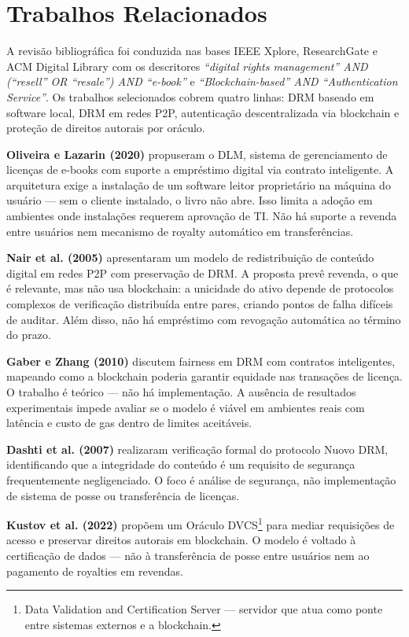 \documentclass[12pt]{article}
\begin{document}
\section{Trabalhos Relacionados}

A revisão bibliográfica foi conduzida nas bases IEEE Xplore, ResearchGate e ACM Digital Library com os descritores \textit{``digital rights management'' AND (``resell'' OR ``resale'') AND ``e-book''} e \textit{``Blockchain-based'' AND ``Authentication Service''}. Os trabalhos selecionados cobrem quatro linhas: DRM baseado em software local, DRM em redes P2P, autenticação descentralizada via blockchain e proteção de direitos autorais por oráculo.

\textbf{Oliveira e Lazarin (2020)} propuseram o DLM, sistema de gerenciamento de licenças de e-books com suporte a empréstimo digital via contrato inteligente. A arquitetura exige a instalação de um software leitor proprietário na máquina do usuário — sem o cliente instalado, o livro não abre. Isso limita a adoção em ambientes onde instalações requerem aprovação de TI. Não há suporte a revenda entre usuários nem mecanismo de royalty automático em transferências.

\textbf{Nair et al. (2005)} apresentaram um modelo de redistribuição de conteúdo digital em redes P2P com preservação de DRM. A proposta prevê revenda, o que é relevante, mas não usa blockchain: a unicidade do ativo depende de protocolos complexos de verificação distribuída entre pares, criando pontos de falha difíceis de auditar. Além disso, não há empréstimo com revogação automática ao término do prazo.

\textbf{Gaber e Zhang (2010)} discutem fairness em DRM com contratos inteligentes, mapeando como a blockchain poderia garantir equidade nas transações de licença. O trabalho é teórico — não há implementação. A ausência de resultados experimentais impede avaliar se o modelo é viável em ambientes reais com latência e custo de gas dentro de limites aceitáveis.

\textbf{Dashti et al. (2007)} realizaram verificação formal do protocolo Nuovo DRM, identificando que a integridade do conteúdo é um requisito de segurança frequentemente negligenciado. O foco é análise de segurança, não implementação de sistema de posse ou transferência de licenças.

\textbf{Kustov et al. (2022)} propõem um Oráculo DVCS\footnote{Data Validation and Certification Server — servidor que atua como ponte entre sistemas externos e a blockchain.} para mediar requisições de acesso e preservar direitos autorais em blockchain. O modelo é voltado à certificação de dados — não à transferência de posse entre usuários nem ao pagamento de royalties em revendas.
\end{document}
